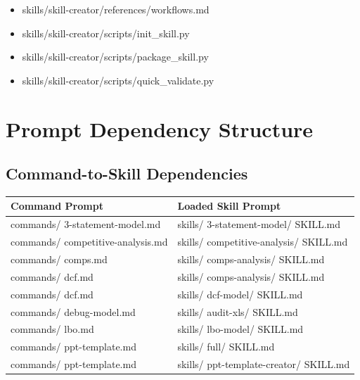 \documentclass[11pt]{article}
\begin{document}
\begin{itemize}[leftmargin=*,itemsep=1pt,topsep=2pt]
\item \hspace*{2.7em}skills/skill-creator/references/workflows.md
\item \hspace*{2.7em}skills/skill-creator/scripts/init\_\allowbreak{}skill.py
\item \hspace*{2.7em}skills/skill-creator/scripts/package\_\allowbreak{}skill.py
\item \hspace*{2.7em}skills/skill-creator/scripts/quick\_\allowbreak{}validate.py
\end{itemize}

\section{Prompt Dependency Structure}

\subsection{Command-to-Skill Dependencies}

\begingroup
\small
\setlength{\tabcolsep}{2pt}
\begin{longtable}{>{\RaggedRight\arraybackslash\hspace{0pt}}p{}>{\RaggedRight\arraybackslash\hspace{0pt}}p{}}
\toprule
{} \textbf{Command Prompt} & \textbf{Loaded Skill Prompt} \\
\midrule
{} commands/ 3-statement-model.md & skills/ 3-statement-model/ SKILL.md \\
{} commands/ competitive-analysis.md & skills/ competitive-analysis/ SKILL.md \\
{} commands/ comps.md & skills/ comps-analysis/ SKILL.md \\
{} commands/ dcf.md & skills/ comps-analysis/ SKILL.md \\
{} commands/ dcf.md & skills/ dcf-model/ SKILL.md \\
{} commands/ debug-model.md & skills/ audit-xls/ SKILL.md \\
{} commands/ lbo.md & skills/ lbo-model/ SKILL.md \\
{} commands/ ppt-template.md & skills/ full/ SKILL.md \\
{} commands/ ppt-template.md & skills/ ppt-template-creator/ SKILL.md \\
\bottomrule
\end{longtable}
\endgroup
\end{document}
